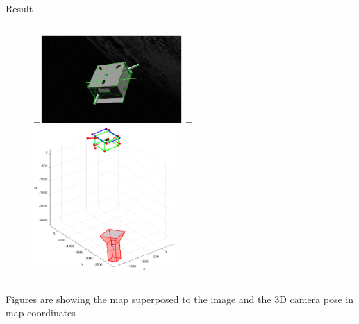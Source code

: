 \documentclass[10pt]{beamer}
\begin{document}
\begin{frame}{Result}
\begin{columns}[T,onlytextwidth]
\begin{column}{0.5\textwidth}
      \begin{figure}
        \centering
        \captionsetup[subfigure]{labelformat=empty}
        =\hbox{\includegraphics[width=0.48\textwidth]{gfx/poseDetermination/trial311modelMap.eps}}%
        =\hbox{\includegraphics[width=0.48\textwidth]{gfx/poseDetermination/cameraWRTSC311.eps}}%
        {\,} \hfill
         \hfill
         \hfill
        {\,}
      \end{figure}
    \end{column}
  \end{columns}

  Figures are showing the map superposed to the image and the 3D camera pose in map coordinates

\end{frame}
\end{document}
